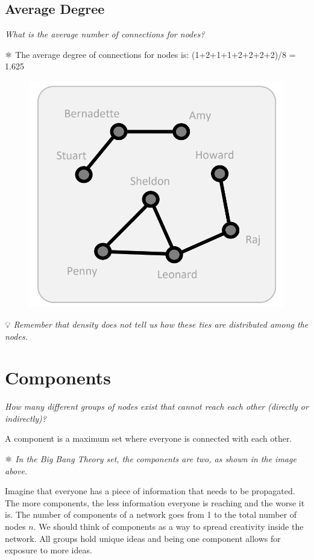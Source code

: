 \documentclass[
  notitlepage,
  onecolumn,
  openany]{book}
\begin{document}
\hypertarget{average-degree-1}{%
\subsection{Average Degree}\label{average-degree-1}}

\emph{What is the average number of connections for nodes?}

⚛️ The average degree of connections for nodes is:
(1+2+1+1+2+2+2+2)/8 = 1.625

\begin{figure}[h!]

{\centering \includegraphics[width=0.5\linewidth]{images/03-Cohesion measures/Untitled} 

}

\end{figure}

💡 \emph{Remember that density does not tell us how these ties are distributed among the nodes.}

\hypertarget{components}{%
\section{Components}\label{components}}

\emph{How many different groups of nodes exist that cannot reach each other (directly or indirectly)?}

A component is a maximum set where everyone is connected with each other.

⚛️ \emph{In the Big Bang Theory set, the components are two, as shown in the image above}.

Imagine that everyone has a piece of information that needs to be propagated. The more components, the less information everyone is reaching and the worse it is. The number of components of a network goes from 1 to the total number of nodes \(n\). We should think of components as a way to spread creativity inside the network. All groups hold unique ideas and being one component allows for exposure to more ideas.
\end{document}

